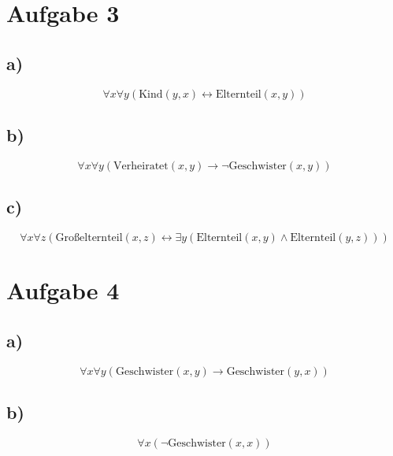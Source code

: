 \documentclass[a4paper,12pt]{article}
\begin{document}
\section*{Aufgabe 3}

\subsection*{a)}
\[
\forall x \forall y \left( \text{Kind}(y, x) \leftrightarrow \text{Elternteil}(x, y) \right)
\]

\subsection*{b)}
\[
\forall x \forall y \left( \text{Verheiratet}(x, y) \rightarrow \neg \text{Geschwister}(x, y) \right)
\]

\subsection*{c)}
\[
\forall x \forall z \left( \text{Großelternteil}(x, z) \leftrightarrow \exists y \left( \text{Elternteil}(x, y) \land \text{Elternteil}(y, z) \right) \right)
\]

\section*{Aufgabe 4}

\subsection*{a)}
\[
\forall x \forall y \left( \text{Geschwister}(x, y) \rightarrow \text{Geschwister}(y, x) \right)
\]

\subsection*{b)}
\[
\forall x \left( \neg \text{Geschwister}(x, x) \right)
\]
\end{document}
